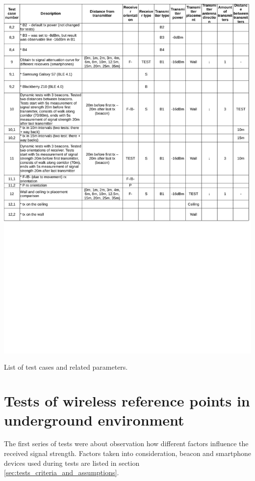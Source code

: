 \documentclass[../main.tex]{subfiles}
\begin{document}
\begin{table}[ht]
\includegraphics[width=\textwidth, trim={0 11cm 0 0},clip]{tables/test_parameters_p2.pdf}
\centering
\caption{List of test cases and related parameters.}
\label{tab:test_parameters}
\end{table}


\FloatBarrier

\section{Tests of wireless reference points in underground environment} %
\label{sec:tests_of_system_and_basic_algorithm}

The first series of tests were about observation how different factors influence the received signal strength. Factors taken into consideration, beacon and smartphone devices used during tests are listed in section \ref{sec:tests_criteria_and_assumptions}.
\end{document}
